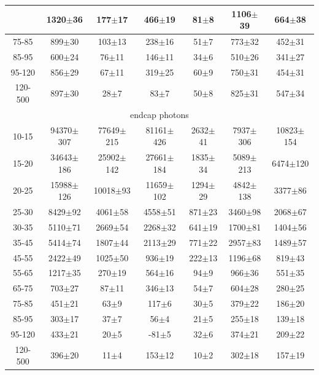 \begin{table}[h]
\begin{center}
\begin{tabular}{|c|c|c|c|c|c|c|}
{65-75 & 1320$\pm$36 & 177$\pm$17 & 466$\pm$19 & 81$\pm$8 & 1106$\pm$39 & 664$\pm$38 \\ \hline 
75-85 & 899$\pm$30 & 103$\pm$13 & 238$\pm$16 & 51$\pm$7 & 773$\pm$32 & 452$\pm$31 \\ \hline 
85-95 & 600$\pm$24 & 76$\pm$11 & 146$\pm$11 & 34$\pm$6 & 510$\pm$26 & 341$\pm$27 \\ \hline 
95-120 & 856$\pm$29 & 67$\pm$11 & 319$\pm$25 & 60$\pm$9 & 750$\pm$31 & 454$\pm$31 \\ \hline 
120-500 & 897$\pm$30 & 28$\pm$7 & 83$\pm$7 & 50$\pm$8 & 825$\pm$31 & 547$\pm$34 \\ \hline 
\multicolumn{7}{|c|}{endcap photons}\\ \hline
10-15 & 94370$\pm$307 & 77649$\pm$215 & 81161$\pm$426 & 2632$\pm$41 & 7937$\pm$306 & 10823$\pm$154 \\ \hline 
15-20 & 34643$\pm$186 & 25902$\pm$142 & 27661$\pm$184 & 1835$\pm$34 & 5089$\pm$213 & 6474$\pm$120 \\ \hline 
20-25 & 15988$\pm$126 & 10018$\pm$93 & 11659$\pm$102 & 1294$\pm$29 & 4842$\pm$138 & 3377$\pm$86 \\ \hline 
25-30 & 8429$\pm$92 & 4061$\pm$58 & 4558$\pm$51 & 871$\pm$23 & 3460$\pm$98 & 2068$\pm$67 \\ \hline 
30-35 & 5110$\pm$71 & 2669$\pm$54 & 2268$\pm$32 & 641$\pm$19 & 1700$\pm$81 & 1404$\pm$56 \\ \hline 
35-45 & 5414$\pm$74 & 1807$\pm$44 & 2113$\pm$29 & 771$\pm$22 & 2957$\pm$83 & 1489$\pm$57 \\ \hline 
45-55 & 2422$\pm$49 & 1025$\pm$50 & 936$\pm$19 & 222$\pm$13 & 1196$\pm$68 & 819$\pm$43 \\ \hline 
55-65 & 1217$\pm$35 & 270$\pm$19 & 564$\pm$16 & 94$\pm$9 & 966$\pm$36 & 551$\pm$35 \\ \hline 
65-75 & 703$\pm$27 & 87$\pm$11 & 346$\pm$13 & 54$\pm$7 & 604$\pm$28 & 280$\pm$25 \\ \hline 
75-85 & 451$\pm$21 & 63$\pm$9 & 117$\pm$6 & 30$\pm$5 & 379$\pm$22 & 186$\pm$20 \\ \hline 
85-95 & 303$\pm$17 & 37$\pm$7 & 56$\pm$4 & 21$\pm$5 & 255$\pm$18 & 139$\pm$18 \\ \hline 
95-120 & 433$\pm$21 & 20$\pm$5 & -81$\pm$5 & 32$\pm$6 & 374$\pm$21 & 209$\pm$22 \\ \hline 
120-500 & 396$\pm$20 & 11$\pm$4 & 153$\pm$12 & 10$\pm$2 & 302$\pm$18 & 157$\pm$19 \\ \hline 
  \end{tabular}
  \label{tab:yields_Wg_to_munu_}
  \end{center}
\end{table}

